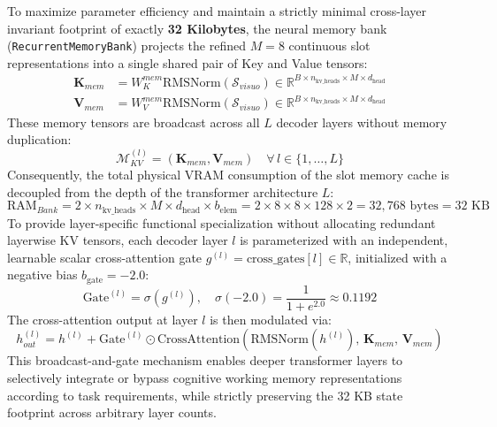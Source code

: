 \documentclass[11pt,a4paper]{article}
\begin{document}
To maximize parameter efficiency and maintain a strictly minimal cross-layer invariant footprint of exactly \textbf{32 Kilobytes}, the neural memory bank (\texttt{RecurrentMemoryBank}) projects the refined $M = 8$ continuous slot representations into a single shared pair of Key and Value tensors:
\begin{align}
\mathbf{K}_{mem} &= W_K^{mem} \text{RMSNorm}(\mathcal{S}_{visuo}) \in \mathbb{R}^{B \times n_{\text{kv\_heads}} \times M \times d_{\text{head}}} \\
\mathbf{V}_{mem} &= W_V^{mem} \text{RMSNorm}(\mathcal{S}_{visuo}) \in \mathbb{R}^{B \times n_{\text{kv\_heads}} \times M \times d_{\text{head}}}
\end{align}
These memory tensors are broadcast across all $L$ decoder layers without memory duplication:
\begin{equation}
\mathcal{M}_{KV}^{(l)} = (\mathbf{K}_{mem}, \mathbf{V}_{mem}) \quad \forall \, l \in \{1, \dots, L\}
\end{equation}
Consequently, the total physical VRAM consumption of the slot memory cache is decoupled from the depth of the transformer architecture $L$:
\begin{equation}
\text{RAM}_{Bank} = 2 \times n_{\text{kv\_heads}} \times M \times d_{\text{head}} \times b_{\text{elem}} = 2 \times 8 \times 8 \times 128 \times 2 = 32,768 \text{ bytes} = 32 \text{ KB}
\end{equation}
To provide layer-specific functional specialization without allocating redundant layerwise KV tensors, each decoder layer $l$ is parameterized with an independent, learnable scalar cross-attention gate $g^{(l)} = \text{cross\_gates}[l] \in \mathbb{R}$, initialized with a negative bias $b_{\text{gate}} = -2.0$:
\begin{equation}
\label{eq:cross_gate}
\text{Gate}^{(l)} = \sigma(g^{(l)}), \quad \sigma(-2.0) = \frac{1}{1 + e^{2.0}} \approx 0.1192
\end{equation}
The cross-attention output at layer $l$ is then modulated via:
\begin{equation}
h_{out}^{(l)} = h^{(l)} + \text{Gate}^{(l)} \odot \text{CrossAttention}\left( \text{RMSNorm}(h^{(l)}), \, \mathbf{K}_{mem}, \, \mathbf{V}_{mem} \right)
\end{equation}
This broadcast-and-gate mechanism enables deeper transformer layers to selectively integrate or bypass cognitive working memory representations according to task requirements, while strictly preserving the 32 KB state footprint across arbitrary layer counts.
\end{document}
